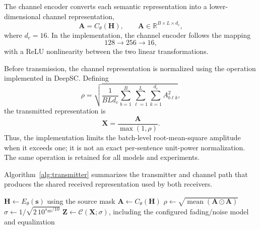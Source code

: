 \documentclass[conference]{IEEEtran}
\begin{document}
The channel encoder converts each semantic representation into a lower-dimensional channel representation,
\begin{equation}
    \mathbf{A}=C_{\theta}(\mathbf{H}),
    \qquad
    \mathbf{A}\in\mathbb{R}^{B\times L\times d_c},
\end{equation}
where $d_c=16$. In the implementation, the channel encoder follows the mapping
\begin{equation}
    128 \rightarrow 256 \rightarrow 16,
\end{equation}
with a ReLU nonlinearity between the two linear transformations.

Before transmission, the channel representation is normalized using the operation implemented in DeepSC. Defining
\begin{equation}
    \rho =
    \sqrt{
    \frac{1}{BLd_c}
    \sum_{b=1}^{B}
    \sum_{\ell=1}^{L}
    \sum_{k=1}^{d_c}
    A_{b\ell k}^{2}},
\end{equation}
the transmitted representation is
\begin{equation}
    \mathbf{X}
    =
    \frac{\mathbf{A}}
    {\max(1,\rho)}.
\label{eq:power}
\end{equation}
Thus, the implementation limits the batch-level root-mean-square amplitude when it exceeds one; it is not an exact per-sentence unit-power normalization. The same operation is retained for all models and experiments.

Algorithm~\ref{alg:transmitter} summarizes the transmitter and channel path that produces the shared received representation used by both receivers.

\begin{algorithm}[t]
\caption{Semantic Transmitter and Channel Propagation}
\label{alg:transmitter}
\small
{}
$\mathbf{H}\leftarrow E_{\theta}(\mathbf{s})$ using the source mask\;
$\mathbf{A}\leftarrow C_{\theta}(\mathbf{H})$\;
$\rho\leftarrow\sqrt{\operatorname{mean}(\mathbf{A}\odot\mathbf{A})}$\;
$\sigma\leftarrow 1/\sqrt{2\,10^{s_{\mathrm{dB}}/10}}$\;
$\mathbf{Z}\leftarrow\mathcal{C}(\mathbf{X};\sigma)$, including the configured fading/noise model and equalization\;
\;
\end{algorithm}
\end{document}
